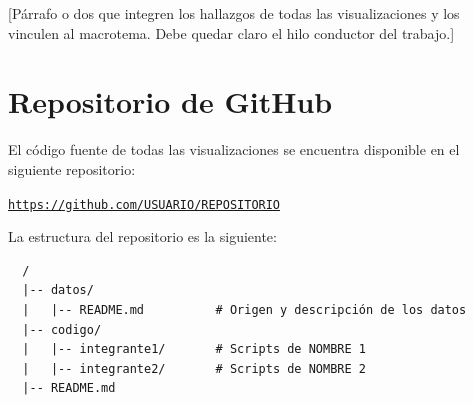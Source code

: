 \documentclass[12pt, letterpaper]{article}
\begin{document}
[Párrafo o dos que integren los hallazgos de todas las visualizaciones y los vinculen al
macrotema. Debe quedar claro el hilo conductor del trabajo.]

\section{Repositorio de GitHub}

El código fuente de todas las visualizaciones se encuentra disponible en el siguiente repositorio:

\begin{center}
  \href{https://github.com/USUARIO/REPOSITORIO}{\texttt{https://github.com/USUARIO/REPOSITORIO}}
\end{center}

La estructura del repositorio es la siguiente:

\begin{verbatim}
  /
  |-- datos/
  |   |-- README.md          # Origen y descripción de los datos
  |-- codigo/
  |   |-- integrante1/       # Scripts de NOMBRE 1
  |   |-- integrante2/       # Scripts de NOMBRE 2
  |-- README.md
\end{verbatim}

\end{document}
